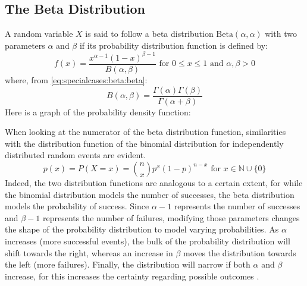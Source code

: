 \documentclass[12pt]{article}
\begin{document}

\pagebreak
\subsection{The Beta Distribution}\label{subsec:specialcases:beta}
A random variable $X$ is said to follow a beta distribution $\text{Beta}(\alpha, \alpha)$ with two parameters $\alpha$
and $\beta$ if its probability distribution function is defined by:
\begin{equation}\label{eq:specialcases:beta:pdf}
	f(x) = \frac{x^{\alpha-1} (1-x)^{\beta-1}}{B(\alpha, \beta)}\text{ for } 0\leq x\leq 1\text{ and }\alpha, \beta > 0
\end{equation}
where, from \autoref{eq:specialcases:beta:beta}:
\begin{equation}
	B(\alpha, \beta) = \frac{\Gamma(\alpha)\Gamma(\beta)}{\Gamma(\alpha+\beta)}
\end{equation}
 Here is a graph of the probability density function:


\pagebreak
When looking at the numerator of the beta distribution function, similarities with the distribution function of the
binomial distribution for independently distributed random events are evident.
\begin{equation}
	p(x) = P(X=x) =\binom{n}{x}p^x(1-p)^{n-x}\text{ for }x\in\mathbb{N}\cup\{0\}
\end{equation}
Indeed, the two distribution functions are analogous to a certain extent, for while the binomial distribution models the
number of successes, the beta distribution models the probability of success.  Since  $\alpha-1$ represents the number
of successes and $\beta-1$ represents the number of failures, modifying those parameters changes the shape of the
probability distribution to model varying probabilities. As $\alpha$ increases (more successful events), the bulk of the
probability distribution will shift towards the right, whereas an increase in $\beta$ moves the distribution towards the
left (more failures). Finally, the distribution will narrow if both $\alpha$ and $\beta$ increase, for this increases the
certainty regarding possible outcomes \cite{kimBetaDistributionIntuition2020, disorboBetaGamma}.
\end{document}
